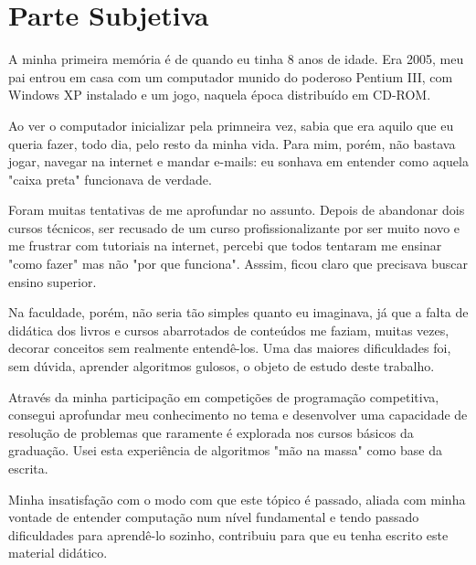 \chapter{Parte Subjetiva}
\label{subjetiva}


A minha primeira memória é de quando eu tinha 8 anos de idade. Era 2005, meu pai entrou em casa com um computador munido do poderoso Pentium III, com Windows XP instalado e um jogo, naquela época distribuído em CD-ROM.

Ao ver o computador inicializar pela primneira vez, sabia que era aquilo que eu queria fazer, todo dia, pelo resto da minha vida. Para mim, porém, não bastava jogar, navegar na internet e mandar e-mails: eu sonhava em entender como aquela "caixa preta" funcionava de verdade.

Foram muitas tentativas de me aprofundar no assunto. Depois de abandonar dois cursos técnicos, ser recusado de um curso profissionalizante por ser muito novo e me frustrar com tutoriais na internet, percebi que todos tentaram me ensinar "como fazer" mas não "por que funciona". Asssim, ficou claro que precisava buscar ensino superior.

Na faculdade, porém, não seria tão simples quanto eu imaginava, já que a falta de didática dos livros e cursos abarrotados de conteúdos me faziam, muitas vezes, decorar conceitos sem realmente entendê-los. Uma das maiores dificuldades foi, sem dúvida, aprender algoritmos gulosos, o objeto de estudo deste trabalho.

Através da minha participação em competições de programação competitiva, consegui aprofundar meu conhecimento no tema e desenvolver uma capacidade de resolução de problemas que raramente é explorada nos cursos básicos da graduação. Usei esta experiência de algoritmos "mão na massa" como base da escrita.  

Minha insatisfação com o modo com que este tópico é passado, aliada com minha vontade de entender computação num nível fundamental e tendo passado dificuldades para aprendê-lo sozinho, contribuiu para que eu tenha escrito este material didático.